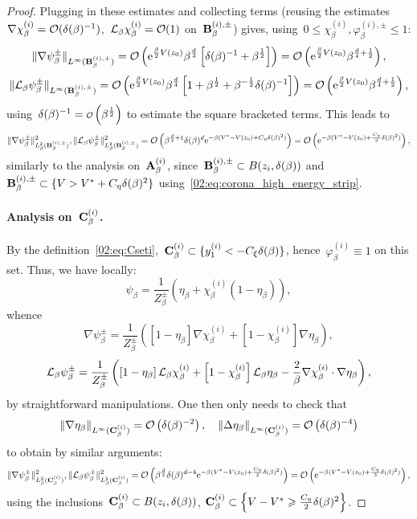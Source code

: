 \begin{proof}
            Plugging in these estimates and collecting terms (reusing the estimates~$\nabla\chi_\beta^{(i)}=\mathcal{O}(\delta(\beta)^{-1})$,~$\mathcal{L}_\beta\chi_\beta^{(i)}=\mathcal{O}(1)$ on~$\mathbf{B}_\beta^{(i),\pm}$) gives, using~$0\leq \chi_\beta^{(i)},\varphi_\beta^{(i),\pm}\leq 1$:
            \[\|\nabla\psi_\beta^{\pm}\|_{L^\infty(\mathbf{B}_\beta^{(i),\pm})}=\mathcal{O}\left(\mathrm{e}^{\frac\beta2 V(z_0)}\beta^{\frac d4}\left[\delta(\beta)^{-1}+\beta^{\frac12}\right]\right)=\mathcal{O}\left(\mathrm{e}^{\frac\beta2 V(z_0)}\beta^{\frac d4+\frac12}\right),\]
            \[\|\mathcal{L}_\beta \psi_\beta^{\pm}\|_{L^\infty(\mathbf{B}_\beta^{(i),\pm})} = \mathcal{O}\left(\mathrm{e}^{\frac\beta2 V(z_0)}\beta^{\frac d4}\left[1+\beta^{\frac12}+\beta^{-\frac12}\delta(\beta)^{-1}\right]\right)=\mathcal{O}\left(\mathrm{e}^{\frac\beta2 V(z_0)}\beta^{\frac d4+\frac12}\right),\]
            using~$\largeRadius(\beta)^{-1}=\smallo\left(\beta^{\frac12}\right)$ to estimate the square bracketed terms. This leads to
            \[\|\nabla\psi_\beta^{\pm}\|^2_{L_\beta^2(\mathbf{B}_\beta^{(i),\pm})},\|\mathcal{L}_\beta \psi_\beta^{\pm}\|^2_{L_\beta^2(\mathbf{B}_\beta^{(i),\pm})} = \mathcal{O}\left(\beta^{\frac d2+1}\delta(\beta)^d\mathrm{e}^{-\beta(V^*-V(z_0)+C_\eta\delta(\beta)^2)}\right)=\mathcal{O}\left(\mathrm{e}^{-\beta(V^*-V(z_0)+\frac{C_\eta}3\delta(\beta)^2)}\right),\]
            similarly to the analysis on~$\mathbf{A}_\beta^{(i)}$, since~$\mathbf{B}_\beta^{(i),\pm} \subset B(z_i,\delta(\beta))$ and~$\mathbf{B}_\beta^{(i),\pm}\subset \{V>V^*+C_\eta\delta(\beta)^2\}$ using~\eqref{02:eq:corona_high_energy_strip}.

            \paragraph{Analysis on~$\mathbf{C}_\beta^{(i)}$.\newline}
            By the definition~\eqref{02:eq:Cseti},~$\mathbf{C}_\beta^{(i)} \subset \{ y_1^{(i)} < -C_\xi\delta(\beta)\}$, hence~$\varphi_\beta^{(i)}\equiv 1$ on this set. Thus, we have locally:
            \[\psi_\beta = \frac1{Z_\beta^{\pm}}\left(\eta_\beta + \chi_\beta^{(i)}(1-\eta_\beta)\right),\]
            whence
            \[\nabla\psi^\pm_\beta = \frac1{Z_\beta^{\pm}}\left(\left[1-\eta_\beta\right]\nabla \chi_\beta^{(i)}+\left[1-\chi_\beta^{(i)}\right]\nabla\eta_\beta\right),\]
            \[\mathcal{L}_\beta\psi_\beta^\pm = \frac1{Z_\beta^{\pm}}\left(\left[1-\eta_\beta\right]\mathcal{L}_\beta \chi_\beta^{(i)}+\left[1-\chi_\beta^{(i)}\right]\mathcal{L}_\beta\eta_\beta - \frac2\beta \nabla \chi_\beta^{(i)}\cdot\nabla\eta_\beta\right),\]
            by straightforward manipulations. One then only needs to check that
            \[\|\nabla \eta_\beta\|_{L^\infty(\mathbf{C}_\beta^{(i)})} = \mathcal{O}\left(\delta(\beta)^{-2}\right),\quad \|\Delta \eta_\beta\|_{L^\infty(\mathbf{C}_\beta^{(i)})} = \mathcal{O}\left(\delta(\beta)^{-4}\right)\]
            to obtain by similar arguments:
            \[\|\nabla\psi_\beta^\pm\|^2_{L_\beta^2(\mathbf{C}_\beta^{(i)})},\|\mathcal{L}_\beta\psi_\beta^\pm\|^2_{L_\beta^2(\mathbf{C}_\beta^{(i)})} = \mathcal{O}\left(\beta^{\frac d2}\delta(\beta)^{d-4}\mathrm{e}^{-\beta(V^*-V(z_0)+\frac{C_\eta}2\delta(\beta)^2)}\right)=\mathcal{O}\left(\mathrm{e}^{-\beta(V^*-V(z_0)+\frac{C_\eta}3\delta(\beta)^2)}\right),\]
            using the inclusions~$\mathbf{C}_\beta^{(i)}\subset B(z_i,\delta(\beta))$, $\mathbf{C}_\beta^{(i)} \subset \left\{V-V^* \geqslant \frac{C_\eta}2 \delta(\beta)^2\right\}$.

\end{proof}
